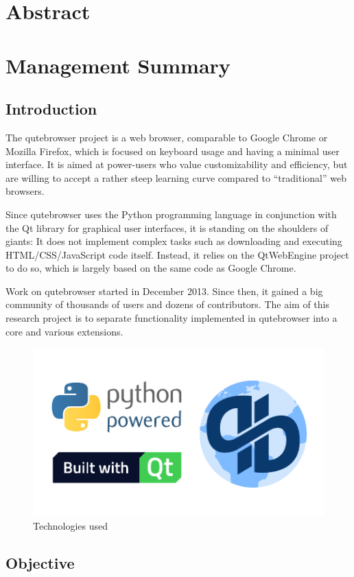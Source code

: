 
\chapter*{Abstract}
\fixme{}

\chapter*{Management Summary}
\section*{Introduction}
The qutebrowser project is a web browser, comparable to Google Chrome or Mozilla
Firefox, which is focused on keyboard usage and having a minimal user
interface. It is aimed at power-users who value customizability and efficiency,
but are willing to accept a rather steep learning curve compared to
``traditional'' web browsers.

Since qutebrowser uses the Python programming language in conjunction with the
Qt library for graphical user interfaces, it is standing on the shoulders of
giants: It does not implement complex tasks such as downloading and executing
HTML/CSS/JavaScript code itself. Instead, it relies on the QtWebEngine project
to do so, which is largely based on the same code as Google Chrome.

Work on qutebrowser started in December 2013. Since then, it gained a big
community of thousands of users and dozens of contributors. The aim of this
research project is to separate functionality implemented in qutebrowser into a
core and various extensions.

\begin{figure}[H]
  \centering
  \includegraphics[width=0.7\linewidth]{img/logos.pdf}
  \caption{Technologies used}
\end{figure}

\section*{Objective}

